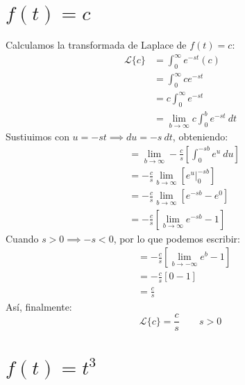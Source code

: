 \documentclass[12pt, a4paper]{article}
\begin{document}
\sffamily


\newpage

\setcounter{section}{1}
\section{\texorpdfstring{\(f(t) = c\)}{f (t) = c}}

Calculamos la transformada de Laplace de \(f(t) = c\):
\begin{align*}
    \mathcal{L}\{c\}&=\int_0^{\infty}e^{-st}(c)\\
    &=\int_0^{\infty}ce^{-st}\\
    &=c\int_0^{\infty}e^{-st}\\
    &=\lim_{b\to\infty}c\int_0^b e^{-st}\ dt
\end{align*}
Sustiuimos con \(u=-st \implies du =-s\ dt\), obteniendo:
\begin{align*}
	&=\lim_{b\to\infty}-\frac{c}{s}\left[\int_0^{-sb}  e^u\ du\right] \\
	&=-\frac{c}{s}\lim_{b\to\infty}\left[e^u\big|_0^{-sb}  \right]\\
	&=-\frac{c}{s}\lim_{b\to\infty}\left[e^{-sb}-e^{0}\right]\\
	&=-\frac{c}{s} \left[ \lim_{b\to\infty} e^{-sb} - 1 \right]
\end{align*}
Cuando \(s > 0 \implies -s < 0\), por lo que podemos escribir:
\begin{align*}
	&= -\frac{c}{s} \left[ \lim_{b\to-\infty} e^{b} - 1 \right] \\
	&= -\frac{c}{s} \left[ 0 - 1 \right] \\
	&= \frac{c}{s}
\end{align*}
Así, finalmente:
\[
\mathcal{L}\{c\}=\frac{c}{s} \qquad s > 0
\]

\setcounter{section}{4}
\section{\texorpdfstring{\(f(t) = t^3\)}{f (t) = t 3}}
\end{document}
